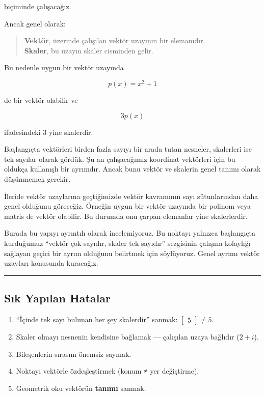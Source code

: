 \documentclass[
  a4paper,
  DIV=11,
  numbers=noendperiod]{scrartcl}
\providecommand{\tightlist}{%
  \setlength{\itemsep}{0pt}\setlength{\parskip}{0pt}}
\begin{document}
biçiminde çalışacağız.

Ancak genel olarak:

\begin{quote}
\textbf{Vektör}, üzerinde çalışılan vektör uzayının bir elemanıdır.\\
\textbf{Skaler}, bu uzayın skaler cisminden gelir.
\end{quote}

Bu nedenle uygun bir vektör uzayında

\[
p(x)=x^2+1
\]

de bir vektör olabilir ve

\[
3p(x)
\]

ifadesindeki \(3\) yine skalerdir.

Başlangıçta vektörleri birden fazla sayıyı bir arada tutan nesneler,
skalerleri ise tek sayılar olarak gördük. Şu an çalışacağımız koordinat
vektörleri için bu oldukça kullanışlı bir ayrımdır. Ancak bunu vektör ve
skalerin genel tanımı olarak düşünmemek gerekir.

İleride vektör uzaylarına geçtiğimizde vektör kavramının sayı
sütunlarından daha genel olduğunu göreceğiz. Örneğin uygun bir vektör
uzayında bir polinom veya matris de vektör olabilir. Bu durumda onu
çarpan elemanlar yine skalerlerdir.

Burada bu yapıyı ayrıntılı olarak incelemiyoruz. Bu noktayı yalnızca
başlangıçta kurduğumuz ``vektör çok sayıdır, skaler tek sayıdır''
sezgisinin çalışma kolaylığı sağlayan geçici bir ayrım olduğunu
belirtmek için söylüyoruz. Genel ayrımı vektör uzayları konusunda
kuracağız.

\begin{center}\rule{0.5\linewidth}{0.5pt}\end{center}

\subsection{Sık Yapılan Hatalar}\label{sux131k-yapux131lan-hatalar}

\begin{enumerate}
\def\labelenumi{\arabic{enumi}.}
\tightlist
\item
  ``İçinde tek sayı bulunan her şey skalerdir'' sanmak:
  \(\begin{bmatrix}5\end{bmatrix}\neq5\).
\item
  Skaler olmayı nesnenin kendisine bağlamak --- çalışılan uzaya bağlıdır
  (\(2+i\)).
\item
  Bileşenlerin sırasını önemsiz saymak.
\item
  Noktayı vektörle özdeşleştirmek (konum ≠ yer değiştirme).
\item
  Geometrik oku vektörün \textbf{tanımı} sanmak.
\end{enumerate}
\end{document}
